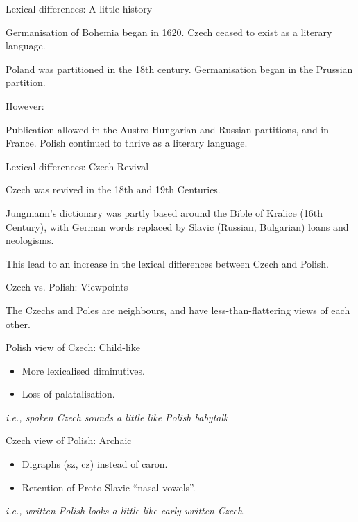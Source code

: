 \documentclass{beamer}
\begin{document}
\begin{frame}{Lexical differences: A little history}

Germanisation of Bohemia began in 1620. Czech ceased to exist as a literary language.

Poland was partitioned in the 18th century. Germanisation began in the Prussian partition.

However: 

Publication allowed in the Austro-Hungarian and Russian partitions, and in France. 
Polish continued to thrive as a literary language.

\end{frame}

\begin{frame}{Lexical differences: Czech Revival}

Czech was revived in the 18th and 19th Centuries.

Jungmann's dictionary was partly based around the Bible of Kralice (16th Century),
with German words replaced by Slavic (Russian, Bulgarian) loans and neologisms.

This lead to an increase in the lexical differences between Czech and Polish.

\end{frame}

\begin{frame}{Czech vs. Polish: Viewpoints}

\begin{center}
The Czechs and Poles are neighbours, and have less-than-flattering
views of each other.
\end{center}

Polish view of Czech: Child-like

\begin{itemize}
\item More lexicalised diminutives.
\item Loss of palatalisation.
\end{itemize}

{\it\small i.e., spoken Czech sounds a little like Polish babytalk}

Czech view of Polish: Archaic

\begin{itemize}
\item Digraphs (sz, cz) instead of caron.
\item Retention of Proto-Slavic ``nasal vowels''.
\end{itemize}

{\it\small i.e., written Polish looks a little like early written Czech.}
\end{frame}
\end{document}

